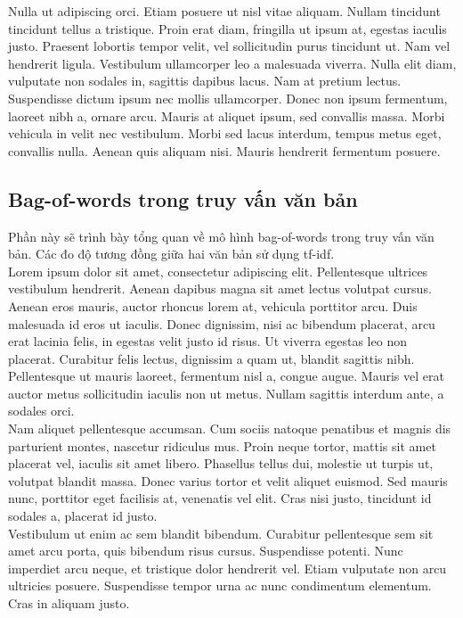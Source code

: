 Nulla ut adipiscing orci. Etiam posuere ut nisl vitae aliquam. Nullam tincidunt tincidunt tellus a tristique. Proin erat diam, fringilla ut ipsum at, egestas iaculis justo. Praesent lobortis tempor velit, vel sollicitudin purus tincidunt ut. Nam vel hendrerit ligula. Vestibulum ullamcorper leo a malesuada viverra. Nulla elit diam, vulputate non sodales in, sagittis dapibus lacus. Nam at pretium lectus. Suspendisse dictum ipsum nec mollis ullamcorper. Donec non ipsum fermentum, laoreet nibh a, ornare arcu. Mauris at aliquet ipsum, sed convallis massa. Morbi vehicula in velit nec vestibulum. Morbi sed lacus interdum, tempus metus eget, convallis nulla. Aenean quis aliquam nisi. Mauris hendrerit fermentum posuere.\\


\subsection{Bag-of-words trong truy vấn văn bản}

Phần này sẽ trình bày tổng quan về mô hình bag-of-words trong truy vấn văn bản. Các đo độ tương đồng giữa hai văn bản sử dụng tf-idf. \\
Lorem ipsum dolor sit amet, consectetur adipiscing elit. Pellentesque ultrices vestibulum hendrerit. Aenean dapibus magna sit amet lectus volutpat cursus. Aenean eros mauris, auctor rhoncus lorem at, vehicula porttitor arcu. Duis malesuada id eros ut iaculis. Donec dignissim, nisi ac bibendum placerat, arcu erat lacinia felis, in egestas velit justo id risus. Ut viverra egestas leo non placerat. Curabitur felis lectus, dignissim a quam ut, blandit sagittis nibh. Pellentesque ut mauris laoreet, fermentum nisl a, congue augue. Mauris vel erat auctor metus sollicitudin iaculis non ut metus. Nullam sagittis interdum ante, a sodales orci.\\

Nam aliquet pellentesque accumsan. Cum sociis natoque penatibus et magnis dis parturient montes, nascetur ridiculus mus. Proin neque tortor, mattis sit amet placerat vel, iaculis sit amet libero. Phasellus tellus dui, molestie ut turpis ut, volutpat blandit massa. Donec varius tortor et velit aliquet euismod. Sed mauris nunc, porttitor eget facilisis at, venenatis vel elit. Cras nisi justo, tincidunt id sodales a, placerat id justo.\\

Vestibulum ut enim ac sem blandit bibendum. Curabitur pellentesque sem sit amet arcu porta, quis bibendum risus cursus. Suspendisse potenti. Nunc imperdiet arcu neque, et tristique dolor hendrerit vel. Etiam vulputate non arcu ultricies posuere. Suspendisse tempor urna ac nunc condimentum elementum. Cras in aliquam justo.\\

